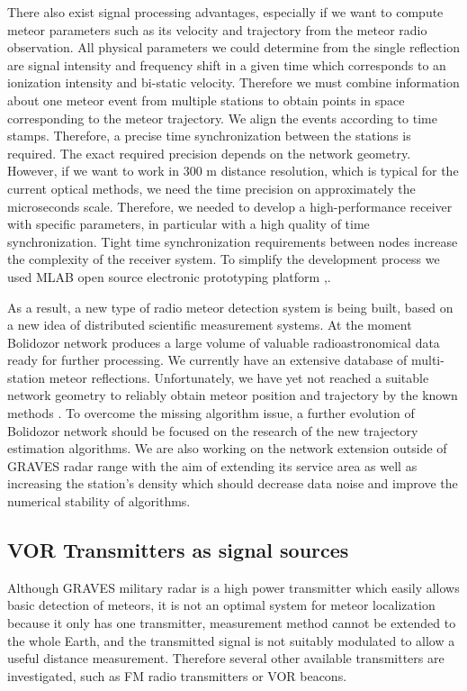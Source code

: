 \documentclass[twoside]{ctuthesis}
\theoremstyle{plain}
\theoremstyle{definition}
\theoremstyle{note}
\begin{document}
There also exist signal processing advantages, especially if we want to compute meteor parameters such as its velocity and trajectory from the meteor radio observation. All physical parameters we could determine from the single reflection are signal intensity and frequency shift in a given time which corresponds to an ionization intensity and bi-static velocity.
Therefore we must combine information about one meteor event from multiple stations to obtain points in space corresponding to the meteor trajectory. We align the events according to time stamps. Therefore, a precise time synchronization between the stations is required. The exact required precision depends on the network geometry. However, if we want to work in 300 m distance resolution, which is typical for the current optical methods, we need the time precision on approximately the microseconds scale. Therefore, we needed to develop a high-performance receiver with specific parameters, in particular with a high quality of time synchronization. Tight time synchronization requirements between nodes increase the complexity of the receiver system. To simplify the development process we used MLAB open source electronic prototyping platform \cite{Bolidozor},\cite{MLAB}.

As a result, a new type of radio meteor detection system is being built, based on a new idea of distributed scientific measurement systems. At the moment Bolidozor network produces a large volume of valuable radioastronomical data ready for further processing.  
We currently have an extensive database of multi-station meteor reflections. Unfortunately, we have yet not reached a suitable network geometry \cite{Positioning_geometry_Influence} to reliably obtain meteor position and trajectory by the known methods \cite{Doppler_method}. 
To overcome the missing algorithm issue, a further evolution of Bolidozor network should be focused on the research of the new trajectory estimation algorithms. We are also working on the network extension outside of GRAVES radar range with the aim of extending its service area as well as increasing the station's density which should decrease data noise and improve the numerical stability of algorithms. 

\subsection{VOR Transmitters as signal sources}
Although GRAVES military radar is a high power transmitter which easily allows basic detection of meteors, it is not an optimal system for meteor localization because it only has one transmitter, measurement method cannot be extended to the whole Earth, and the transmitted signal is not suitably modulated to allow a useful distance measurement.  Therefore several other available transmitters are investigated, such as FM radio transmitters or VOR beacons. 
\end{document}
